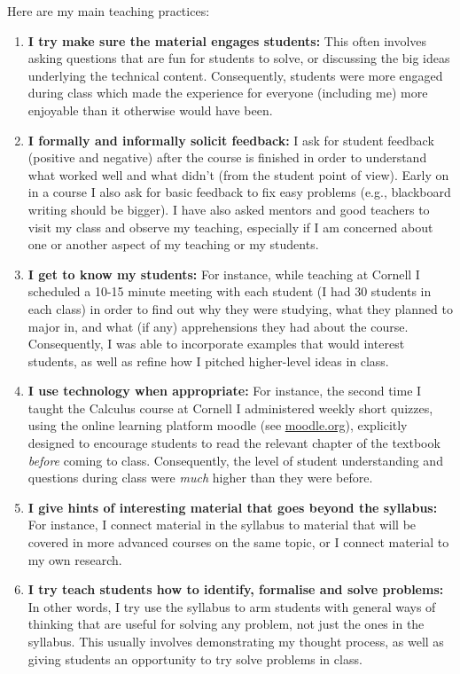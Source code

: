 \documentclass[a4paper,10pt]{scrartcl}
\begin{document}
Here are my main teaching practices:
\begin{enumerate}
 \item \textbf{I try make sure the material engages students:} This often involves asking questions that are fun for students to solve, or discussing the big ideas underlying the technical content. Consequently, students were more engaged during class which made the experience for everyone (including me) more enjoyable than it otherwise would have been. 
 
 \item \textbf{I formally and informally solicit feedback:} I ask for student feedback (positive and negative) after the course is finished in order to understand what worked well and what didn't (from the student point of view). Early on in a course I also ask for basic feedback to fix easy problems (e.g., blackboard writing should be bigger). I have also asked mentors and good teachers to visit my class and observe my teaching, especially if I am concerned about one or another aspect of my teaching or my students.
 
 \item \textbf{I get to know my students:} For instance, while teaching at Cornell I scheduled a 10-15 minute meeting with each student (I had 30 students in each class) in order to find out 
 why they were studying, what they planned to major in, and what (if any) apprehensions they had about the course. Consequently, I was able to incorporate examples that would interest students, 
 as well as refine how I pitched higher-level ideas in class.
 
 \item \textbf{I use technology when appropriate:} For instance, the second time I taught the Calculus course at Cornell I administered weekly short quizzes, using the online learning platform moodle (see \url{moodle.org}),   explicitly designed to encourage students to read the relevant chapter of the textbook \textit{before} coming to class. Consequently, the level of student understanding and questions during class were \textit{much} higher than they were before.
 
 \item \textbf{I give hints of interesting material that goes beyond the syllabus:} For instance, I connect material in the syllabus to material that will be covered in more advanced courses on the same topic, or I connect material to my own research.
 
 \item \textbf{I try teach students how to identify, formalise and solve problems:} In other words, I try use the syllabus to arm students with general ways of thinking that are useful for solving 
 any problem, not just the ones in the syllabus. This usually involves demonstrating my thought process, as well as giving students an opportunity to try solve problems in class. 
 

\end{enumerate}
\end{document}
